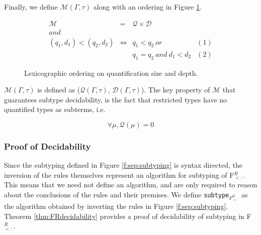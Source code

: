 \documentclass[runningheads]{llncs}
\begin{document}
Finally, we define $\mathcal{M}(\Gamma, \tau)$ along with an ordering in Figure \ref{f:measure}.
\begin{figure}[t]
\begin{minipage}{\linewidth}
\[
\begin{array}{lclr}
\mathcal{M}
			& =
			& \mathcal{Q} \times \mathcal{D} &\\
\textit{and} & & \\
(q_1, d_1) < (q_2, d_2)
			& \iff
			& q_1 < q_2 \ \textit{or} & (1)\\

			&
			&  q_1 = q_2\ \textit{and}\ d_1 < d_2 & (2)
			
\end{array}
\]
\caption{Lexicographic ordering on quantification size and depth.}
\label{f:measure}
\end{minipage}
\end{figure}
$\mathcal{M}(\Gamma, \tau)$ is defined as ($\mathcal{Q}(\Gamma, \tau)$, $\mathcal{D}(\Gamma, \tau)$). 
The key property of $\mathcal{M}$ that guarantees subtype decidability, is the fact that restricted types
have no quantified types as subterms, i.e. 
\begin{property}
\label{prop:Qrestricted}
$$\forall \mu, \mathcal{Q}(\mu) = 0$$
\end{property}

\subsubsection{Proof of Decidability}

Since the subtyping defined in Figure \ref{f:sep:subtyping} is syntax directed, the inversion of the rules themselves represent an algorithm for 
subtyping of F$_{<:}^R$. This means that we need not define an algorithm, and are only required to reason about the conclusions of the rules and their premises.
We define \texttt{subtype}$_{F_{<:}^R}$ as the algorithm obtained by inverting the rules in Figure \ref{f:sep:subtyping}.
Theorem \ref{thm:FRdecidability} provides a proof of decidability of subtyping in F$_{<:}^R$.
\end{document}
